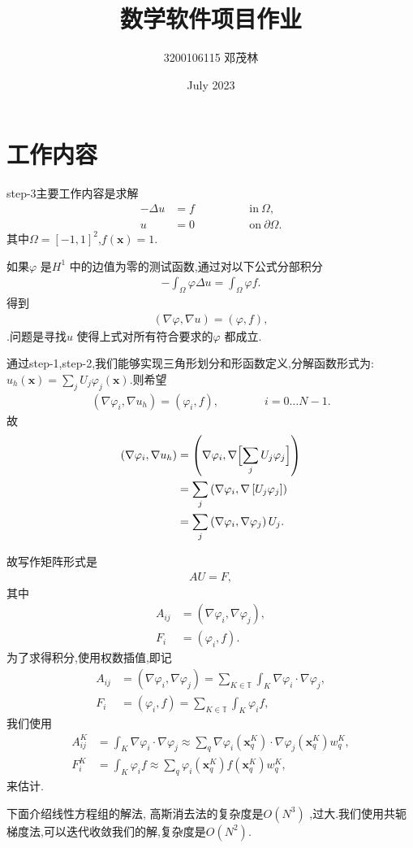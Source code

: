 \documentclass[UTF8]{ctexart}
\title{数学软件项目作业}
\author{3200106115 邓茂林}
\date{July 2023}
\begin{document}
\maketitle
\section{工作内容}
step-3主要工作内容是求解
\begin{align*}
  -\Delta u &= f \qquad\qquad & \text{in}\ \Omega,
  \\
  u &= 0 \qquad\qquad & \text{on}\ \partial\Omega.
\end{align*}
其中$\Omega=[-1,1]^2$,$f(\mathbf x)=1$.\par
如果$\varphi$ 是$H^1$ 中的边值为零的测试函数,通过对以下公式分部积分
\begin{align*}
  -\int_\Omega \varphi \Delta u = \int_\Omega \varphi f.
\end{align*}
得到\begin{align*}
  (\nabla\varphi, \nabla u)
   = (\varphi, f),
\end{align*}
.问题是寻找$u$ 使得上式对所有符合要求的$\varphi$ 都成立.\par
通过step-1,step-2,我们能够实现三角形划分和形函数定义,分解函数形式为:$u_h(\mathbf x)=\sum_j U_j \varphi_j(\mathbf
x)$.则希望\begin{align*}
  (\nabla\varphi_i, \nabla u_h)
   = (\varphi_i, f),
   \qquad\qquad
   i=0\ldots N-1.
\end{align*}
故
\begin{align*}
  (\nabla\varphi_i, \nabla u_h)
  &= \left(\nabla\varphi_i, \nabla \Bigl[\sum_j U_j \varphi_j\Bigr]\right)
\\
  &= \sum_j \left(\nabla\varphi_i, \nabla \left[U_j \varphi_j\right]\right)
\\
  &= \sum_j \left(\nabla\varphi_i, \nabla \varphi_j \right) U_j.
\end{align*}

故写作矩阵形式是\begin{align*}
  A U = F,
\end{align*}
其中\begin{align*}
  A_{ij} &= (\nabla\varphi_i, \nabla \varphi_j),
  \\
  F_i &= (\varphi_i, f).
\end{align*}
为了求得积分,使用权数插值,即记\begin{align*}
    A_{ij} &= (\nabla\varphi_i, \nabla \varphi_j)
    = \sum_{K \in {\mathbb T}} \int_K \nabla\varphi_i \cdot \nabla \varphi_j,
    \\
    F_i &= (\varphi_i, f)
    = \sum_{K \in {\mathbb T}} \int_K \varphi_i f,
  \end{align*}
  我们使用\begin{align*}
    A^K_{ij} &=
    \int_K \nabla\varphi_i \cdot \nabla \varphi_j
    \approx
    \sum_q \nabla\varphi_i(\mathbf x^K_q) \cdot \nabla
    \varphi_j(\mathbf x^K_q) w_q^K,
    \\
    F^K_i &=
    \int_K \varphi_i f
    \approx
    \sum_q \varphi_i(\mathbf x^K_q) f(\mathbf x^K_q) w^K_q,
  \end{align*}
  来估计.\par
  下面介绍线性方程组的解法,
高斯消去法的复杂度是$O(N^3) $ ,过大.我们使用共轭梯度法,可以迭代收敛我们的解,复杂度是$O(N^2)$.\newpage
\end{document}
